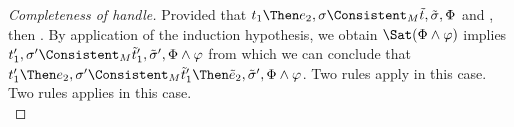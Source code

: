 \begin{proof}[Completeness of handle]
    {
    Provided that $t_1\Then e_2,\sigma\Consistent_{M}\tilde{t},\tilde{\sigma},\Phi$ and ,
    then .
    By application of the induction hypothesis, we obtain $\Sat(\Phi\land\phi)$ implies $t_1',\sigma'\Consistent_{M}\tilde{t}_1',\tilde{\sigma}',\Phi\land\phi$
    from which we can conclude that $t_1'\Then e_2,\sigma'\Consistent_{M}\tilde{t}_1'\Then \tilde{e}_2,\tilde{\sigma}',\Phi\land\phi$.
    }
    {
    Two rules apply in this case.\\
      {
      }
      {
      }
    }
      {
      Two rules applies in this case.\\
      {
}}
\end{proof}
